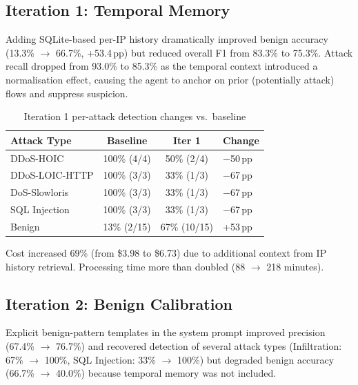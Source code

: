 \documentclass[12pt, a4paper, oneside]{report}
\begin{document}
\subsection{Iteration 1: Temporal Memory}

Adding SQLite-based per-IP history dramatically improved benign accuracy
(13.3\% $\rightarrow$ 66.7\%, +53.4\,pp) but reduced overall F1 from 83.3\% to
75.3\%. Attack recall dropped from 93.0\% to 85.3\% as the temporal context
introduced a normalisation effect, causing the agent to anchor on prior
(potentially attack) flows and suppress suspicion.

\begin{table}[H]
\centering
\caption{Iteration 1 per-attack detection changes vs.\ baseline}
\label{tab:iter1-changes}
\begin{tabular}{@{}lccl@{}}
\toprule
\textbf{Attack Type} & \textbf{Baseline} & \textbf{Iter 1} & \textbf{Change} \\
\midrule
DDoS-HOIC       & 100\% (4/4) & 50\% (2/4)  & $-$50\,pp \\
DDoS-LOIC-HTTP  & 100\% (3/3) & 33\% (1/3)  & $-$67\,pp \\
DoS-Slowloris   & 100\% (3/3) & 33\% (1/3)  & $-$67\,pp \\
SQL Injection    & 100\% (3/3) & 33\% (1/3)  & $-$67\,pp \\
\midrule
Benign           & 13\% (2/15) & 67\% (10/15) & +53\,pp \\
\bottomrule
\end{tabular}
\end{table}

Cost increased 69\% (from \$3.98 to \$6.73) due to additional context from IP
history retrieval. Processing time more than doubled (88 $\rightarrow$ 218
minutes).

\subsection{Iteration 2: Benign Calibration}

Explicit benign-pattern templates in the system prompt improved precision
(67.4\% $\rightarrow$ 76.7\%) and recovered detection of several attack types
(Infiltration: 67\% $\rightarrow$ 100\%, SQL Injection: 33\% $\rightarrow$ 100\%)
but degraded benign accuracy (66.7\% $\rightarrow$ 40.0\%) because temporal
memory was not included.
\end{document}
